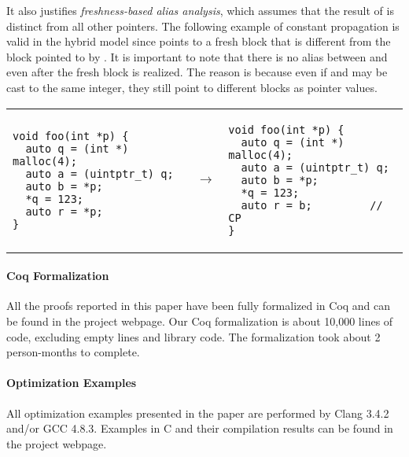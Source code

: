 It also justifies %
\textit{freshness-based alias analysis}, which assumes that the result of
 is distinct from all other pointers.  The 
following example of constant propagation is valid in the
hybrid model since  points to a fresh block that
is different from the block pointed to by .
It is important to note that there is no alias
between  and  even after
the fresh block is realized. The reason is because
even if  and  may be cast to the same integer,
they still point to different blocks as pointer values.
\begin{center}
\begin{tabular}{@{}l@{}l@{~~}l}
\small
\begin{minipage}{0.45\textwidth}
\begin{verbatim}
void foo(int *p) {
  auto q = (int *) malloc(4);
  auto a = (uintptr_t) q;
  auto b = *p;
  *q = 123;
  auto r = *p;
}
\end{verbatim}
\end{minipage}
&
$~\rightarrow$
&
\small
\begin{minipage}{0.45\textwidth}
\begin{verbatim}
void foo(int *p) {
  auto q = (int *) malloc(4);
  auto a = (uintptr_t) q;
  auto b = *p;
  *q = 123;
  auto r = b;         // CP
}
\end{verbatim}
\end{minipage}
\end{tabular}
\end{center}


\paragraph{Coq Formalization}
All the proofs reported in this paper have been fully formalized in
Coq and can be found in the project webpage.  Our Coq formalization is about 10,000 lines of code,
excluding empty lines and library code.  The formalization took about 2
person-months to complete.

\paragraph{Optimization Examples}
All optimization examples presented in the paper are performed by Clang
3.4.2 and/or GCC 4.8.3.  Examples in C and their compilation
results can be found in the project webpage.

